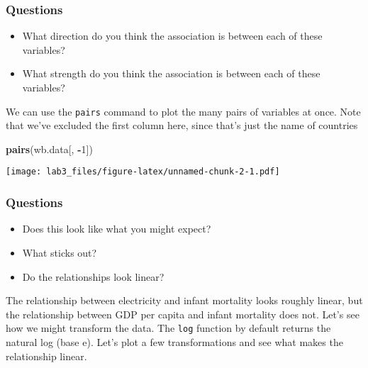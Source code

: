 \documentclass[
]{article}
\newenvironment{Shaded}{\begin{snugshade}}{\end{snugshade}}
\newcommand{\DecValTok}[1]{\textcolor[rgb]{0.00,0.00,0.81}{#1}}
\newcommand{\FunctionTok}[1]{\textcolor[rgb]{0.13,0.29,0.53}{\textbf{#1}}}
\newcommand{\NormalTok}[1]{#1}
\newcommand{\SpecialCharTok}[1]{\textcolor[rgb]{0.81,0.36,0.00}{\textbf{#1}}}
\providecommand{\tightlist}{%
  \setlength{\itemsep}{0pt}\setlength{\parskip}{0pt}}
\begin{document}
\subsubsection{Questions}\label{questions-1}

\begin{itemize}
\tightlist
\item
  What direction do you think the association is between each of these
  variables?
\item
  What strength do you think the association is between each of these
  variables?
\end{itemize}

We can use the \texttt{pairs} command to plot the many pairs of
variables at once. Note that we've excluded the first column here, since
that's just the name of countries

\begin{Shaded}
\begin{Highlighting}[]
\FunctionTok{pairs}\NormalTok{(wb.data[, }\SpecialCharTok{{-}}\DecValTok{1}\NormalTok{])}
\end{Highlighting}
\end{Shaded}

\texttt{[image: lab3\_files/figure-latex/unnamed-chunk-2-1.pdf]}

\subsubsection{Questions}\label{questions-2}

\begin{itemize}
\tightlist
\item
  Does this look like what you might expect?
\item
  What sticks out?
\item
  Do the relationships look linear?
\end{itemize}

The relationship between electricity and infant mortality looks roughly
linear, but the relationship between GDP per capita and infant mortality
does not. Let's see how we might transform the data. The \texttt{log}
function by default returns the natural log (base e). Let's plot a few
transformations and see what makes the relationship linear.
\end{document}
